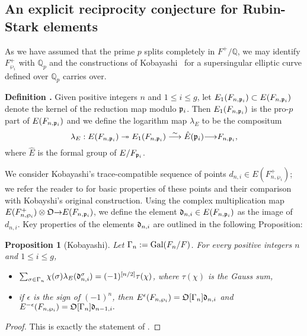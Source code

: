 \documentclass[12pt]{amsart}
\numberwithin{equation}{section}
\newenvironment{define}{\par\medskip\noindent\refstepcounter{thm}
\bgroup{\hspace*{-0.15 cm}\bf{Definition}
\thethm.}\bgroup}{\egroup \egroup\par\medskip}
\newtheorem{prop}[thm]{Proposition}
\begin{document}
\subsection{An explicit reciprocity conjecture for Rubin-Stark elements}
\label{subsec:reciprocityconj}
As we have assumed that the prime $p$ splits completely in $F^+/{\mathbb{Q}}$, we may identify $F^+_{\wp_i}$ with ${\mathbb{Q}}_p$ and the constructions of Kobayashi~\cite[\S4]{kobayashi03} for a supersingular elliptic curve defined over ${\mathbb{Q}}_p$ carries over.
\begin{define}
\label{def:formallog}
Given positive integers $n$ and $1\leq i\leq g$, let $E_1(F_{n,\frak{p}_i})\subset E(F_{n,\frak{p}_i})$ denote the kernel of the reduction map modulo $\frak{p}_i$. Then $E_1(F_{n,\frak{p}_i})$ is the pro-$p$ part of $E(F_{n,\frak{p}_i})$ and we define the logarithm map $\lambda_E$ to be the compositum
$$\lambda_E:E(F_{n,\frak{p}_i})\twoheadrightarrow E_1(F_{n,\frak{p}_i})\stackrel{\sim}{\longrightarrow}\hat{E}(\frak{p}_i){\longrightarrow} F_{n,\frak{p}_i},$$
where $\hat{E}$ is the formal group of $E/F_{\frak{p}_i}$.
\end{define}

We consider Kobayashi's trace-compatible sequence of points $d_{n,i}\in E(F_{n,\wp_i}^+)$; we refer the reader to \cite[\S3]{pollackrubin} for basic properties of these points and their comparison with Kobayshi's original construction. Using the complex multiplication map $E(F_{n,\wp_i}^+)\otimes{\frak{O}}{\rightarrow} E(F_{n,\frak{p}_i})$, we define the element $\frak{d}_{n,i} \in E(F_{n,\frak{p}_i})$ as the image of $d_{n,i}$. Key properties of the elements $\frak{d}_{n,i}$ are outlined in the following Proposition:
\begin{prop}[Kobayashi] Let $\Gamma_n:=\textup{Gal}(F_n/F)$. For every positive integers $n$ and $1\leq i \leq g$,
\label{prop:dngenerators}
\begin{itemize}
\item[(i)] $\sum_{\sigma\in \Gamma_n}\chi(\sigma)\lambda_E(\frak{d}_{n,i}^\sigma)=(-1)^{\left[n/2\right]}\tau(\chi)$,
    where $\tau(\chi)$ is the Gauss sum,
\item[(ii)] if $\epsilon$ is the sign of $(-1)^n$, then $E^{\epsilon}(F_{n,\wp_i})={\frak{O}}[\Gamma_n]\frak{d}_{n,i}$ and $E^{-\epsilon}(F_{n,\wp_i})={\frak{O}}[\Gamma_n]\frak{d}_{n-1,i}.$
\end{itemize}
\end{prop}
\begin{proof}
This is exactly the statement of \cite[Theorem 3.2(iv)-(v)]{pollackrubin}.
\end{proof}
\end{document}
